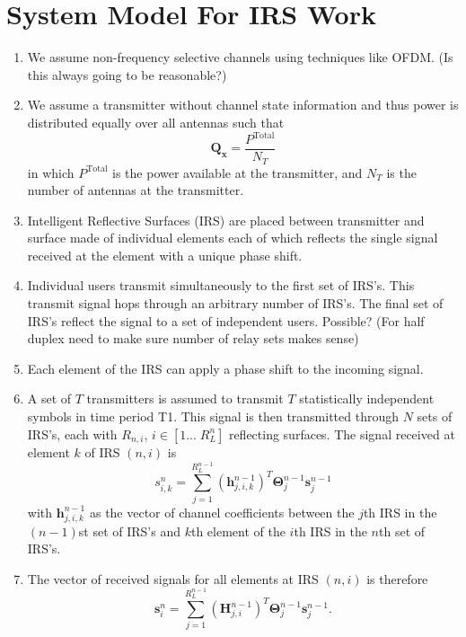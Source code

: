 \documentclass[12pt,a4paper]{report}
\begin{document}
\section{System Model For IRS Work}
\begin{enumerate}
\item 
	We assume non-frequency selective channels using techniques like OFDM. (Is this always going to be reasonable?)
	
\item 
	We assume a transmitter without channel state information and thus power is distributed equally over all antennas such that
	\begin{equation}
	\mathbf{Q_{\mathbf{x}}} = \frac{P^{\text{Total}}}{N_T}
	\end{equation}
	in which $P^{\text{Total}}$ is the power available at the transmitter, and $N_T$ is the number of antennas at the transmitter. 
	
\item Intelligent Reflective Surfaces (IRS) are placed between transmitter and surface made of individual elements each of which reflects the single signal received at the element with a unique phase shift.
\item Individual users transmit simultaneously to the first set of IRS's. This transmit signal hops through an arbitrary number of IRS's. The final set of IRS's reflect the signal to a set of independent users. Possible? (For half duplex need to make sure number of relay sets makes sense)

\item
Each element of the IRS can apply a phase shift to the incoming signal.
\item 
A set of $T$ transmitters is assumed to transmit $T$ statistically independent symbols in time period T1. This signal is then transmitted through $N$ sets of IRS's, each with $R_{n,i}$, $i \in [1... \; R^n_L]$ reflecting surfaces. The signal received at element $k$ of IRS $(n,i)$ is 
\begin{equation}
s^{n}_{i,k} = \sum_{j = 1}^{R^{n-1}_L} (\mathbf{h}^{n-1}_{j,i,k})^T \boldsymbol{\Theta}^{n-1}_{j}\mathbf{s}^{n-1}_{j}
\end{equation}
with $\mathbf{h}^{n-1}_{j,i,k}$ as the vector of channel coefficients between the $j$th IRS in the $(n-1)$st set of IRS's and $k$th element of the $i$th IRS in the $n$th set of IRS's.

\item
The vector of received signals for all elements at IRS $(n,i)$ is therefore
\begin{equation}
\mathbf{s}^{n}_{i} = \sum_{j = 1}^{R^{n-1}_L} (\mathbf{H}^{n-1}_{j,i})^T\boldsymbol{\Theta}^{n-1}_{j}\mathbf{s}^{n-1}_{j}.
\end{equation}




\end{enumerate}
\end{document}
